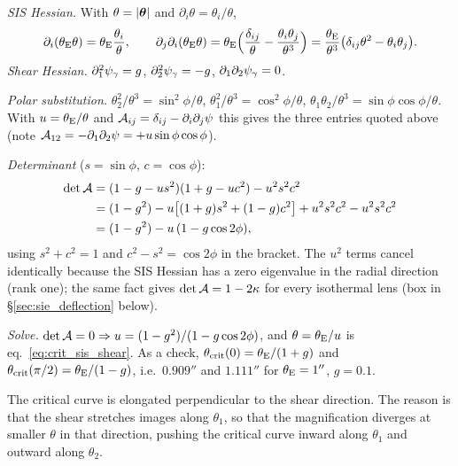 \begin{derivation}
\textit{SIS Hessian.}  With $\theta = |\boldsymbol{\theta}|$ and
$\partial_i\theta = \theta_i/\theta$,
\[
  \partial_i(\theta_{\mathrm{E}}\theta) = \theta_{\mathrm{E}}\frac{\theta_i}{\theta},
  \qquad
  \partial_j\partial_i(\theta_{\mathrm{E}}\theta)
  = \theta_{\mathrm{E}}\Big(\frac{\delta_{ij}}{\theta} - \frac{\theta_i\theta_j}{\theta^3}\Big)
  = \frac{\theta_{\mathrm{E}}}{\theta^3}\big(\delta_{ij}\theta^2 - \theta_i\theta_j\big).
\]
\textit{Shear Hessian.}  $\partial_1^2\psi_\gamma = g$,
$\partial_2^2\psi_\gamma = -g$, $\partial_1\partial_2\psi_\gamma = 0$.

\textit{Polar substitution.}  $\theta_2^2/\theta^3 = \sin^2\phi/\theta$,
$\theta_1^2/\theta^3 = \cos^2\phi/\theta$, $\theta_1\theta_2/\theta^3 =
\sin\phi\cos\phi/\theta$.  With $u = \theta_{\mathrm{E}}/\theta$ and
$\mathcal{A}_{ij} = \delta_{ij} - \partial_i\partial_j\psi$ this gives the three
entries quoted above (note $\mathcal{A}_{12} = -\partial_1\partial_2\psi =
+u\sin\phi\cos\phi$).

\textit{Determinant} ($s = \sin\phi$, $c = \cos\phi$):
\begin{align*}
  \det\mathcal{A}
  &= (1-g-us^2)(1+g-uc^2) - u^2s^2c^2 \\
  &= (1-g^2) - u\big[(1+g)s^2 + (1-g)c^2\big] + u^2s^2c^2 - u^2s^2c^2 \\
  &= (1-g^2) - u\,(1 - g\cos 2\phi),
\end{align*}
using $s^2 + c^2 = 1$ and $c^2 - s^2 = \cos 2\phi$ in the bracket.  The $u^2$
terms cancel identically because the SIS Hessian has a zero eigenvalue in the
radial direction (rank one); the same fact gives $\det\mathcal{A} = 1 - 2\kappa$ for
every isothermal lens (box in \S\ref{sec:sie_deflection} below).

\textit{Solve.}  $\det\mathcal{A} = 0 \Rightarrow u = (1-g^2)/(1-g\cos2\phi)$, and
$\theta = \theta_{\mathrm{E}}/u$ is eq.~\eqref{eq:crit_sis_shear}.  As a check,
$\theta_{\mathrm{crit}}(0) = \theta_{\mathrm{E}}/(1+g)$ and
$\theta_{\mathrm{crit}}(\pi/2) = \theta_{\mathrm{E}}/(1-g)$, i.e.\ $0.909''$ and
$1.111''$ for $\theta_{\mathrm{E}} = 1''$, $g = 0.1$.
\end{derivation}


\begin{remark}
The critical curve is elongated perpendicular to the shear
direction.  The reason is that the shear stretches images
along $\theta_1$, so that the magnification diverges at smaller
$\theta$ in that direction, pushing the critical curve inward along
$\theta_1$ and outward along $\theta_2$.
\end{remark}

